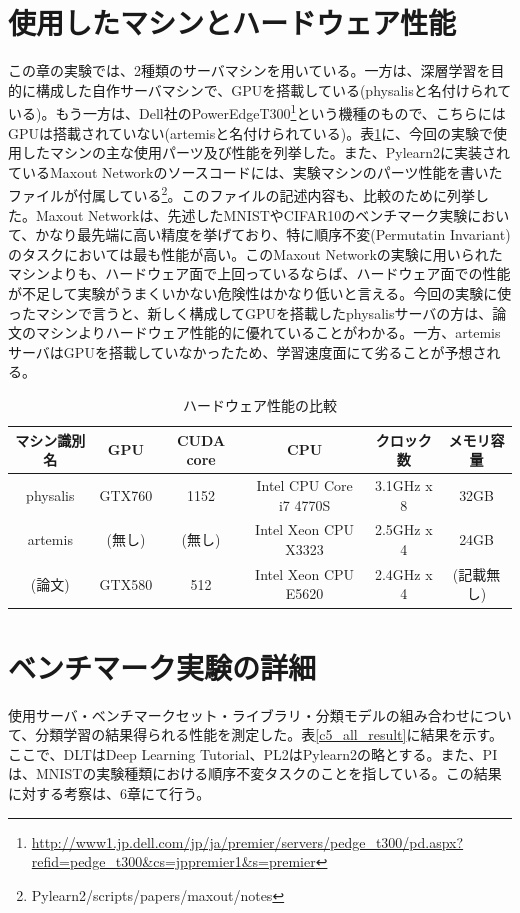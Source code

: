 \section{使用したマシンとハードウェア性能}
この章の実験では、2種類のサーバマシンを用いている。一方は、深層学習を目的に構成した自作サーバマシンで、GPUを搭載している(physalisと名付けられている)。もう一方は、Dell社のPowerEdgeT300\footnote{\url{http://www1.jp.dell.com/jp/ja/premier/servers/pedge_t300/pd.aspx?refid=pedge_t300&cs=jppremier1&s=premier}}という機種のもので、こちらにはGPUは搭載されていない(artemisと名付けられている)。表\ref{c5_hardware_spec}に、今回の実験で使用したマシンの主な使用パーツ及び性能を列挙した。また、Pylearn2に実装されているMaxout Networkのソースコードには、実験マシンのパーツ性能を書いたファイルが付属している\footnote{Pylearn2/scripts/papers/maxout/notes}。このファイルの記述内容も、比較のために列挙した。Maxout Networkは、先述したMNISTやCIFAR10のベンチマーク実験において、かなり最先端に高い精度を挙げており、特に順序不変(Permutatin Invariant)のタスクにおいては最も性能が高い。このMaxout Networkの実験に用いられたマシンよりも、ハードウェア面で上回っているならば、ハードウェア面での性能が不足して実験がうまくいかない危険性はかなり低いと言える。今回の実験に使ったマシンで言うと、新しく構成してGPUを搭載したphysalisサーバの方は、論文のマシンよりハードウェア性能的に優れていることがわかる。一方、artemisサーバはGPUを搭載していなかったため、学習速度面にて劣ることが予想される。
\begin{table}[tbp]
 \begin{center}
  \caption{ハードウェア性能の比較}
  \begin{tabular}{|c|c|c|c|c|c|}\hline
  マシン識別名 & GPU & CUDA core & CPU & クロック数 & メモリ容量\\ \hline
physalis & GTX760 & 1152 & Intel CPU Core i7 4770S & 3.1GHz x 8 & 32GB\\ \hline
artemis & (無し) & (無し) & Intel Xeon CPU X3323 & 2.5GHz x 4 & 24GB\\ \hline
(論文) &GTX580 & 512 & Intel Xeon CPU E5620 &  2.4GHz x 4 & (記載無し)\\ \hline
  \end{tabular}
 \end{center}

 \label{c5_hardware_spec}
\end{table}

\section{ベンチマーク実験の詳細}
使用サーバ・ベンチマークセット・ライブラリ・分類モデルの組み合わせについて、分類学習の結果得られる性能を測定した。表\ref{c5_all_result}に結果を示す。ここで、DLTはDeep Learning Tutorial、PL2はPylearn2の略とする。また、PIは、MNISTの実験種類における順序不変タスクのことを指している。この結果に対する考察は、6章にて行う。


